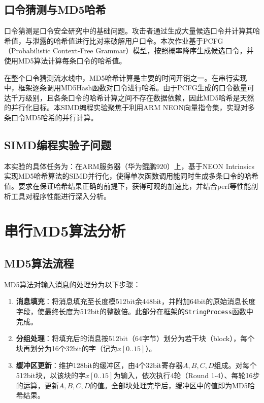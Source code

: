 \documentclass[UTF8,a4paper,10pt]{ctexart}
\begin{document}
\subsection{口令猜测与MD5哈希}

口令猜测是口令安全研究中的基础问题。攻击者通过生成大量候选口令并计算其哈希值，与泄露的哈希值进行比对来破解用户口令。本次作业基于PCFG（Probabilistic Context-Free Grammar）模型，按照概率降序生成候选口令，并使用MD5算法计算每条口令的哈希值。

在整个口令猜测流水线中，MD5哈希计算是主要的时间开销之一。在串行实现中，框架逐条调用MD5Hash函数对口令进行哈希。由于PCFG生成的口令数量可达千万级别，且各条口令的哈希计算之间不存在数据依赖，因此MD5哈希是天然的并行化目标。本SIMD编程实验聚焦于利用ARM NEON向量指令集，实现对多条口令MD5哈希的并行计算。

\subsection{SIMD编程实验子问题}

本实验的具体任务为：在ARM服务器（华为鲲鹏920）上，基于NEON Intrinsics实现MD5哈希算法的SIMD并行化，使得单次函数调用能同时生成多条口令的哈希值。要求在保证哈希结果正确的前提下，获得可观的加速比，并结合perf等性能剖析工具对程序性能进行深入分析。

\section{串行MD5算法分析}

\subsection{MD5算法流程}

MD5算法对输入消息的处理分为以下步骤：

\begin{enumerate}
  \item \textbf{消息填充}：将消息填充至长度模512bit余448bit，并附加64bit的原始消息长度字段，使最终长度为512bit的整数倍。此部分在框架的\lstinline{StringProcess}函数中完成。
  \item \textbf{分组处理}：将填充后的消息按512bit（64字节）划分为若干块（block），每个块再划分为16个32bit的字（记为$x[0..15]$）。
  \item \textbf{缓冲区更新}：维护128bit的缓冲区，由4个32bit寄存器$A,B,C,D$组成。对每个512bit块，以该块的字$x[0..15]$为输入，依次执行4轮（Round 1-4）、每轮16步的运算，更新$A,B,C,D$的值。全部块处理完毕后，缓冲区中的值即为MD5哈希结果。
\end{enumerate}
\end{document}
